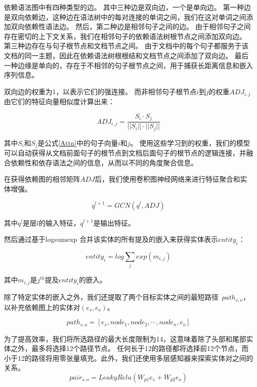 \documentclass[bachelor]{thesis-uestc}
\begin{document}
依赖语法图中有四种类型的边。
其中三种边是双向边，一个是单向边。
第一种边是双向依赖边，这种边在语法树中的每对连接的单词之间，我们在这对单词之间添加双向依赖性语法边。
然后，第二种边是相邻句子之间的边。
由于相邻句子之间存在密切的上下文关系，我们在相邻句子的依赖语法树根节点之间添加双向边。
第三种边存在与句子根节点和文档节点之间。
由于文档中的每个句子都服务于该文档的同一主题，因此在依赖语法树根根结和文档节点之间添加了双向边。
最后一种边缘是单向的，存在于不相邻的句子根节点之间，用于捕获长距离信息和嵌入序列信息。\par
双向边的权重为1，以表示它们的强连接。
而非相邻句子根节点$i$到$j$的权重$ADJ_{i, j}$由它们的特征向量相似度计算出来：

\begin{equation}\label{edge weight}
    ADJ_{i,j} = \frac{S_i \cdot S_j}{||S_i|| \cdot ||S_j||}
\end{equation}

其中$S_i$和$S_j$是公式\ref{Attn}中的句子向量$i$和$j$。
使用这些学习到的权重，我们的模型可以自动获得从文档前面句子的根节点到文档后面句子的根节点的逻辑连接，并融合依赖性和依存语法之间的信息，从而以不同的角度聚合信息。
\par

在获得依赖图的相邻矩阵$ADJ$后，我们使用卷积图神经网络来进行特征聚合和实体增强。

\begin{equation}
    q^{l+1} = GCN(q^{l}, ADJ)
\end{equation}

其中$q^l$是层$l$的输入特征，$q^{l+1}$是输出特征。\par
然后通过基于logsumexp \cite{jia-etal-2019-document}合并该实体的所有提及的嵌入来获得实体表示$entity_i$：

\begin{equation}\label{logsumexp}
    entity_i =  log \sum_{j} exp(m_{i,j})
\end{equation}

其中$m_{i, j}$是$j^{th}$提及$entity_i$的嵌入。\par
除了特定实体的嵌入之外，我们还提取了两个目标实体之间的最短路径\ $path_{s, o}$，以补充依赖图上的实体对$(e_s,e_o)$。

\begin{equation}
    path_{s,o} = [ e_s, node_1, node_2, \cdots, node_n, e_o ]
\end{equation}

为了提高效率，我们将所选路径的最大长度限制为14，这意味着除了头部和尾部实体之外，最多将选择12个路径节点。
任何长于12的路径都将选择前12个节点，而小于12的路径将用零张量填充。此外，我们还使用多层感知器来探索实体对之间的关系。
\begin{equation}
    pair_{s,o} = LeakyRelu(W_{p1}e_s + W_{p2}e_o)
\end{equation}
\par
\end{document}
